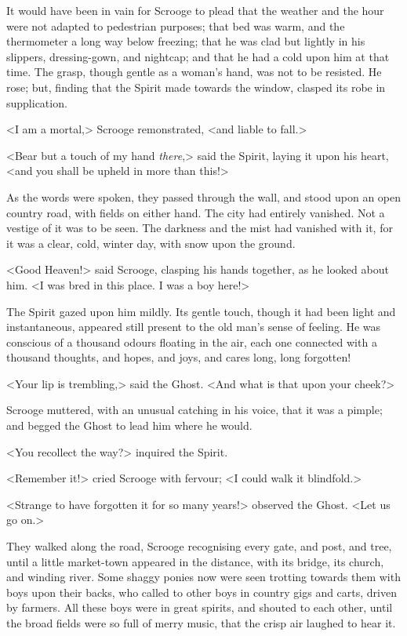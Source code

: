 It would have been in vain for Scrooge to plead that the weather and the hour were not adapted to pedestrian purposes; that bed was warm, and the thermometer a long way below freezing; that he was clad but lightly in his slippers, dressing-gown, and nightcap; and that he had a cold upon him at that time. The grasp, though gentle as a woman's hand, was not to be resisted. He rose; but, finding that the Spirit made towards the window, clasped its robe in supplication.

<I am a mortal,> Scrooge remonstrated, <and liable to fall.>

<Bear but a touch of my hand \textit{there},> said the Spirit, laying it upon his heart, <and you shall be upheld in more than this!>

As the words were spoken, they passed through the wall, and stood upon an open country road, with fields on either hand. The city had entirely vanished. Not a vestige of it was to be seen. The darkness and the mist had vanished with it, for it was a clear, cold, winter day, with snow upon the ground.

<Good Heaven!> said Scrooge, clasping his hands together, as he looked about him. <I was bred in this place. I was a boy here!>

The Spirit gazed upon him mildly. Its gentle touch, though it had been light and instantaneous, appeared still present to the old man's sense of feeling. He was conscious of a thousand odours floating in the air, each one connected with a thousand thoughts, and hopes, and joys, and cares long, long forgotten!

<Your lip is trembling,> said the Ghost. <And what is that upon your cheek?>

Scrooge muttered, with an unusual catching in his voice, that it was a pimple; and begged the Ghost to lead him where he would.

<You recollect the way?> inquired the Spirit.

<Remember it!> cried Scrooge with fervour; <I could walk it blindfold.>

<Strange to have forgotten it for so many years!> observed the Ghost. <Let us go on.>

They walked along the road, Scrooge recognising every gate, and post, and tree, until a little market-town appeared in the distance, with its bridge, its church, and winding river. Some shaggy ponies now were seen trotting towards them with boys upon their backs, who called to other boys in country gigs and carts, driven by farmers. All these boys were in great spirits, and shouted to each other, until the broad fields were so full of merry music, that the crisp air laughed to hear it.

